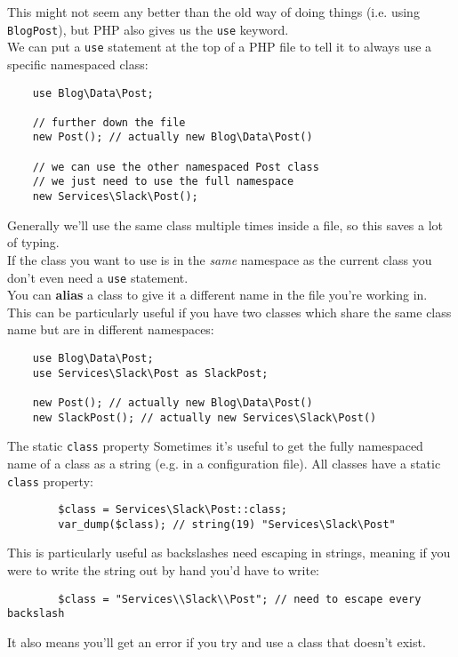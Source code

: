 This might not seem any better than the old way of doing things (i.e. using \texttt{BlogPost}), but PHP also gives us the \texttt{use} keyword.
\\

We can put a \texttt{use} statement at the top of a PHP file to tell it to always use a specific namespaced class:

\begin{verbatim}
    use Blog\Data\Post;

    // further down the file
    new Post(); // actually new Blog\Data\Post()

    // we can use the other namespaced Post class
    // we just need to use the full namespace
    new Services\Slack\Post();
\end{verbatim}

Generally we'll use the same class multiple times inside a file, so this saves a lot of typing.
\\

If the class you want to use is in the \textit{same} namespace as the current class you don't even need a \texttt{use} statement.
\\

You can \textbf{alias} a class to give it a different name in the file you're working in. This can be particularly useful if you have two classes which share the same class name but are in different namespaces:

\begin{verbatim}
    use Blog\Data\Post;
    use Services\Slack\Post as SlackPost;

    new Post(); // actually new Blog\Data\Post()
    new SlackPost(); // actually new Services\Slack\Post()
\end{verbatim}


\begin{infobox}{The static \texttt{class} property}
    Sometimes it's useful to get the fully namespaced name of a class as a string (e.g. in a configuration file). All classes have a static \texttt{class} property:

    \begin{verbatim}
        $class = Services\Slack\Post::class;
        var_dump($class); // string(19) "Services\Slack\Post"
    \end{verbatim}

    This is particularly useful as backslashes need escaping in strings, meaning if you were to write the string out by hand you'd have to write:

    \begin{verbatim}
        $class = "Services\\Slack\\Post"; // need to escape every backslash
    \end{verbatim}

    It also means you'll get an error if you try and use a class that doesn't exist.
\end{infobox}





